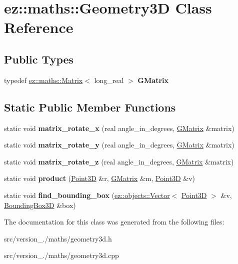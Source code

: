 \hypertarget{classez_1_1maths_1_1Geometry3D}{}\section{ez\+:\+:maths\+:\+:Geometry3D Class Reference}
\label{classez_1_1maths_1_1Geometry3D}
\subsection*{Public Types}
\begin{DoxyCompactItemize}
\item 
\mbox{\label{classez_1_1maths_1_1Geometry3D_a6fd780ac0cf0a374c4ce5ba672124e47}} 
typedef \hyperlink{classez_1_1maths_1_1Matrix}{ez\+::maths\+::\+Matrix}$<$ long\+\_\+real $>$ {\bfseries G\+Matrix}
\end{DoxyCompactItemize}
\subsection*{Static Public Member Functions}
\begin{DoxyCompactItemize}
\item 
\mbox{\label{classez_1_1maths_1_1Geometry3D_a984d41dccfd8ae531dd1f881b1b871d4}} 
static void {\bfseries matrix\+\_\+rotate\+\_\+x} (real angle\+\_\+in\+\_\+degrees, \hyperlink{classez_1_1maths_1_1Matrix}{G\+Matrix} \&matrix)
\item 
\mbox{\label{classez_1_1maths_1_1Geometry3D_aba5c04e727d4037805a1ba49fcd31c74}} 
static void {\bfseries matrix\+\_\+rotate\+\_\+y} (real angle\+\_\+in\+\_\+degrees, \hyperlink{classez_1_1maths_1_1Matrix}{G\+Matrix} \&matrix)
\item 
\mbox{\label{classez_1_1maths_1_1Geometry3D_afec5eb63f2cad9405ad2a1ed1a61a888}} 
static void {\bfseries matrix\+\_\+rotate\+\_\+z} (real angle\+\_\+in\+\_\+degrees, \hyperlink{classez_1_1maths_1_1Matrix}{G\+Matrix} \&matrix)
\item 
\mbox{\label{classez_1_1maths_1_1Geometry3D_a086bb92115126299f7ac74af0e7363a6}} 
static void {\bfseries product} (\hyperlink{classez_1_1maths_1_1Point3D}{Point3D} \&r, \hyperlink{classez_1_1maths_1_1Matrix}{G\+Matrix} \&m, \hyperlink{classez_1_1maths_1_1Point3D}{Point3D} \&v)
\item 
\mbox{\label{classez_1_1maths_1_1Geometry3D_acbf35ab08644da0746774f926f6b9568}} 
static void {\bfseries find\+\_\+bounding\+\_\+box} (\hyperlink{classez_1_1objects_1_1Vector}{ez\+::objects\+::\+Vector}$<$ \hyperlink{classez_1_1maths_1_1Point3D}{Point3D} $>$ \&v, \hyperlink{classez_1_1maths_1_1BoundingBox3D}{Bounding\+Box3D} \&box)
\end{DoxyCompactItemize}


The documentation for this class was generated from the following files\+:\begin{DoxyCompactItemize}
\item 
src/version\+\_./maths/geometry3d.\+h\item 
src/version\+\_./maths/geometry3d.\+cpp\end{DoxyCompactItemize}
